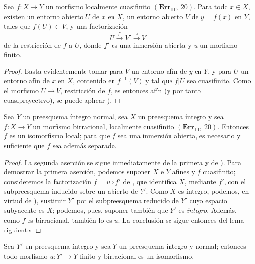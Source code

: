 
\begin{corollary}[8.12.9]
\label{IV.8.12.9}
Sea $f:X\to Y$ un morfismo localmente cuasifinito $(\mathbf{Err}_{\text{III}},~20)$.
Para todo $x\in X$, existen un entorno abierto $U$ de $x$ en $X$, un entorno abierto $V$ de $y=f(x)$ en $Y$, tales que $f(U)\subset V$, y una factorización
\[
U\xrightarrow{f'}V'\xrightarrow{u}V
\]
de la restricción de $f$ a $U$, donde $f'$ es una inmersión abierta y $u$ un morfismo finito.
\end{corollary}

\begin{proof}
Basta evidentemente tomar para $V$ un entorno afín de $y$ en $Y$, y para $U$ un entorno afín de $x$ en $X$, contenido en $f^{-1}(V)$ y tal que $f|U$ sea cuasifinito.
Como el morfismo $U\to V$, restricción de $f$, es entonces afín (y por tanto cuasiproyectivo), se puede aplicar ).
\end{proof}

\begin{corollary}[8.12.10]
\label{IV.8.12.10}
Sea $Y$ un preesquema íntegro normal, sea $X$ un preesquema íntegro y sea $f:X\to Y$ un morfismo birracional, localmente cuasifinito $(\mathbf{Err}_{\text{III}},~20)$.
Entonces $f$ es un isomorfismo local; para que $f$ sea una inmersión abierta, es necesario y suficiente que $f$ sea además separado.
\end{corollary}

\begin{proof}
La segunda aserción se sigue inmediatamente de la primera y de ).
Para demostrar la primera aserción, podemos suponer $X$ e $Y$ afines y $f$ cuasifinito; consideremos la factorización $f=u\circ f'$ de , que identifica $X$, mediante $f'$, con el subpreesquema inducido sobre un abierto de $Y'$.
Como $X$ es íntegro, podemos, en virtud de ), sustituir $Y'$ por el subpreesquema reducido de $Y'$ cuyo espacio subyacente es $\overline{X}$; podemos, pues, suponer también que $Y'$ es \emph{íntegro}.
Además, como $f$ es birracional, también lo es $u$.
La conclusión se sigue entonces del lema siguiente:
\end{proof}

\begin{lemma}[8.12.10.1]
\label{IV.8.12.10.1}
Sea $Y'$ un preesquema íntegro y sea $Y$ un preesquema íntegro y normal; entonces todo morfismo $u:Y'\to Y$ finito y birracional es un isomorfismo.
\end{lemma}

